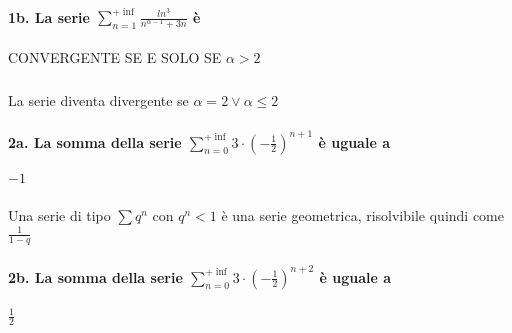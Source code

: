 \documentclass[12pt, a4paper, openany]{book}
\begin{document}
\paragraph{1b. La serie $\sum^{+\inf}_{n=1} \frac{ln^3}{n^{\alpha - 1} + 3n}$ è} CONVERGENTE SE E SOLO SE $\alpha > 2$
\subparagraph{} La serie diventa divergente se $\alpha = 2 \lor \alpha \leq 2$

\paragraph{2a. La somma della serie $\sum^{+\inf}_{n=0} 3\cdot (-\frac{1}{2})^{n+1}$ è uguale a} $-1$
\subparagraph{}
Una serie di tipo $\sum q^n$ con $q^n < 1$ è una serie geometrica, risolvibile quindi come $\frac{1}{1-q}$
\paragraph{2b. La somma della serie $\sum^{+\inf}_{n=0} 3\cdot (-\frac{1}{2})^{n+2}$ è uguale a} $\frac{1}{2}$
\end{document}
